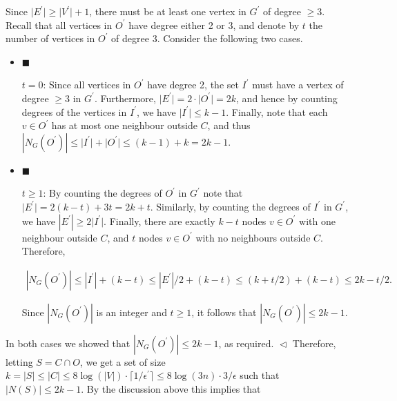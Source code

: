 Since $\lvert E^{\prime}\rvert\geq\lvert V^{\prime}\rvert+1$, there must be at least one vertex in $G^{\prime}$ of degree $\geq 3$.
Recall that all vertices in $O^{\prime}$ have degree either 2 or 3, and denote by $t$ the number of vertices in $O^{\prime}$ of degree 3.
Consider the following two cases.\par


\begin{itemize}


\item[] 
$\blacksquare$ 


$t=0$:
Since all vertices in $O^{\prime}$ have degree 2, the set $I^{\prime}$ must have a vertex of degree $\geq 3$ in $G^{\prime}$. Furthermore, $\lvert E^{\prime}\rvert=2\cdot\lvert O^{\prime}\rvert=2k$, and hence by counting degrees of the vertices in $I^{\prime}$, we have $\lvert I^{\prime}\rvert\leq k-1$.
Finally, note that each $v\in O^{\prime}$ has at most one neighbour outside $C$, and thus $|N_{G}(O^{\prime})|\leq\lvert I^{\prime}\rvert+\lvert O^{\prime}\rvert\leq(k-1)+k=2k-1$.\par





\item[] 
$\blacksquare$ 


$t\geq 1$:
By counting the degrees of $O^{\prime}$ in $G^{\prime}$ note that $\lvert E^{\prime}\rvert=2(k-t)+3t=2k+t$.
Similarly, by counting the degrees of $I^{\prime}$ in $G^{\prime}$, we have $|E^{\prime}|\geq 2\lvert I^{\prime}\rvert$.
Finally, there are exactly $k-t$ nodes $v\in O^{\prime}$ with one neighbour outside $C$, and $t$ nodes $v\in O^{\prime}$ with no neighbours outside $C$.
Therefore,\par


\[\begin{gathered}
|N_{G}(O^{\prime})|\leq|I^{\prime}|+(k-t)\leq|E^{\prime}|/2+(k-t)\leq(k+t/2)+(k-t)\leq 2k-t/2.
\end{gathered}\]


Since $|N_{G}(O^{\prime})|$ is an integer and $t\geq 1$, it follows that
$|N_{G}(O^{\prime})|\leq 2k-1$.\par





\end{itemize}


In both cases we showed that $|N_{G}(O^{\prime})|\leq 2k-1$, as required.
$\vartriangleleft$
Therefore, letting $S=C\cap O$, we get a set of size $k=\lvert S\rvert\leq\lvert C\rvert\leq 8\log(\lvert V\rvert)\cdot\lceil 1/\epsilon^{\prime}\rceil\leq 8\log(3n)\cdot 3/\epsilon$ such that $\lvert N(S)\rvert\leq 2k-1$. By the discussion above this implies that\par


